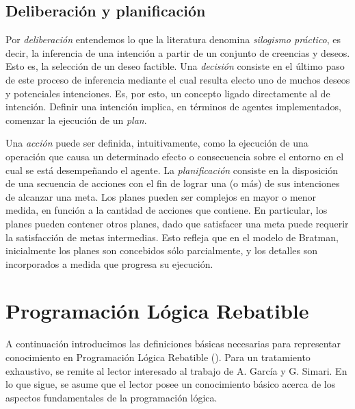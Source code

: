 \subsection{Deliberación y planificación}
\label{sub:deliberacion_planificacion}
 
 Por \textit{deliberación} entendemos lo que la literatura denomina
 \textit{silogismo práctico}, es decir, la inferencia de una intención
 a partir de un conjunto de creencias y deseos.
 Esto es, la selección de un deseo factible.
 Una \textit{decisión}  consiste en el último paso de este proceso de
 inferencia mediante el cual  resulta electo uno de muchos deseos y
 potenciales intenciones.
 Es, por esto, un concepto ligado directamente al de intención.
 Definir una intención implica, en  términos de agentes implementados,
 comenzar la ejecución de un \textit{plan}.
 
 Una \textit{acción} puede ser definida, intuitivamente, como la
 ejecución de una operación que causa un determinado efecto o
 consecuencia sobre el entorno en el cual se está desempeñando el
 agente.
 La \textit{planificación} consiste  en la disposición de una secuencia
 de acciones con el fin de lograr una (o más) de sus intenciones de
 alcanzar una meta.
 Los planes pueden ser complejos en mayor o menor medida, en función a
 la cantidad de acciones que contiene.
 En  particular, los planes pueden contener otros planes, dado que
 satisfacer una meta puede requerir la satisfacción de metas
 intermedias.
 Esto refleja que en  el modelo de Bratman, inicialmente los planes son
 concebidos sólo parcialmente,  y los detalles son incorporados a
 medida que progresa su ejecución.

\section{Programación Lógica Rebatible}
\label{sec:programacion_logica_rebatible}
 
 A continuación introducimos las definiciones básicas necesarias para
 representar conocimiento en Programación Lógica Rebatible (\DLP). Para
 un tratamiento exhaustivo, se remite al lector interesado al trabajo
 de A. García y G. Simari\cite{delp04}.  En lo que sigue, se asume que
 el lector posee un conocimiento básico acerca de los aspectos
 fundamentales de la programación lógica.

